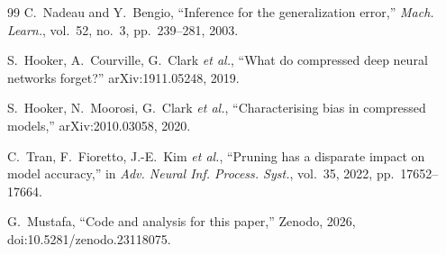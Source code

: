\documentclass[11pt,a4paper]{article}
\newif\ifblind
\newcommand{\anon}[1]{\textsc{[anonymised]}}
\newcommand{\anon}[1]{#1}
\begin{document}
{\begin{thebibliography}{99}
 C.~Nadeau and Y.~Bengio, ``Inference for the generalization error,'' \emph{Mach. Learn.}, vol.~52, no.~3, pp.~239--281, 2003.

 S.~Hooker, A.~Courville, G.~Clark \emph{et al.}, ``What do compressed deep neural networks forget?'' arXiv:1911.05248, 2019.

 S.~Hooker, N.~Moorosi, G.~Clark \emph{et al.}, ``Characterising bias in compressed models,'' arXiv:2010.03058, 2020.

 C.~Tran, F.~Fioretto, J.-E.~Kim \emph{et al.}, ``Pruning has a disparate impact on model accuracy,'' in \emph{Adv. Neural Inf. Process. Syst.}, vol.~35, 2022, pp.~17652--17664.

\ifblind
\bibitem{dataset2026} \anon{} ``Code and analysis for this paper,'' archived artefact, 2026.
\else
{} G.~Mustafa, ``Code and analysis for this paper,'' Zenodo, 2026, doi:10.5281/zenodo.23118075.
\fi

\end{thebibliography}}
\end{document}
